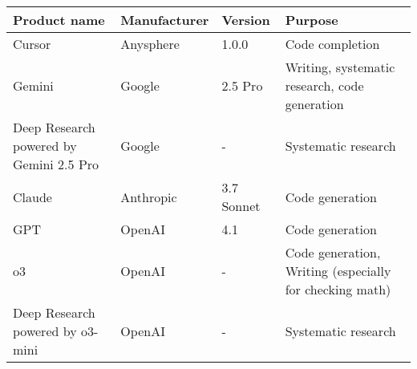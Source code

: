 \begin{table}[H]
    \centering
    \begin{tabular}{llll}
        \toprule
        Product name & Manufacturer & Version & Purpose \\
        \midrule
        Cursor & Anysphere & 1.0.0 & Code completion \\
        Gemini & Google & 2.5 Pro & Writing, systematic research, code generation \\
        Deep Research powered by Gemini 2.5 Pro & Google & - & Systematic research \\
        Claude & Anthropic &  3.7 Sonnet & Code generation \\
        GPT & OpenAI & 4.1 & Code generation \\
        o3 & OpenAI & - & Code generation, Writing (especially for checking math) \\
        Deep Research powered by o3-mini & OpenAI & - & Systematic research \\
    \end{tabular}
\end{table}